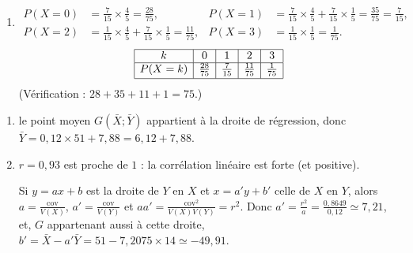 \begin{description}
\begin{enumerate}
\begin{enumerate}
						\item {}
							\begin{align*}
								P(X=0) &= \tfrac{7}{15}\times\tfrac{4}{5} = \tfrac{28}{75}, &
								P(X=1) &= \tfrac{7}{15}\times\tfrac{4}{5} + \tfrac{7}{15}\times\tfrac{1}{5} = \tfrac{35}{75} = \tfrac{7}{15},\\
								P(X=2) &= \tfrac{1}{15}\times\tfrac{4}{5} + \tfrac{7}{15}\times\tfrac{1}{5} = \tfrac{11}{75}, &
								P(X=3) &= \tfrac{1}{15}\times\tfrac{1}{5} = \tfrac{1}{75}.
							\end{align*}
							\[
							\begin{array}{|c|c|c|c|c|}
								\hline
								k & 0 & 1 & 2 & 3 \\ \hline
								P(X=k) & \frac{28}{75} & \frac{7}{15} & \frac{11}{75} & \frac{1}{75} \\[.5ex] \hline
							\end{array}
							\]
							(Vérification : $28 + 35 + 11 + 1 = 75$.)
					\end{enumerate}
			\end{enumerate}
		\item[B.]
			\begin{enumerate}
				\item {}
					le point moyen $G(\bar{X};\bar{Y})$ appartient à la droite de régression, donc
					$\bar{Y} = 0{,}12\times 51 + 7{,}88 = 6{,}12 + 7{,}88$.

				\item {}
					$r = 0{,}93$ est proche de $1$ : la corrélation linéaire est forte (et positive).


					Si $y = ax + b$ est la droite de $Y$ en $X$ et $x = a'y + b'$ celle de $X$ en $Y$, alors
					$a = \frac{\mathrm{cov}}{V(X)}$, $a' = \frac{\mathrm{cov}}{V(Y)}$ et $aa' = \frac{\mathrm{cov}^2}{V(X)V(Y)} = r^2$.
					Donc $a' = \frac{r^2}{a} = \frac{0{,}8649}{0{,}12} \simeq 7{,}21$, et, $G$ appartenant aussi à cette droite,
					$b' = \bar{X} - a'\bar{Y} = 51 - 7{,}2075\times14 \simeq -49{,}91$.

			\end{enumerate}
	\end{description}
